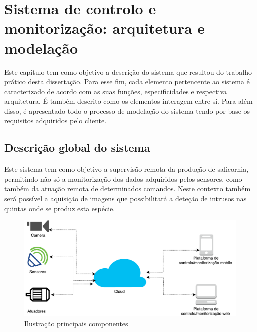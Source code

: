 

\chapter{Sistema de controlo e monitorização: arquitetura e modelação}


Este capítulo tem como objetivo a descrição do sistema que resultou do trabalho prático
desta dissertação. Para esse fim, cada elemento pertencente ao sistema é caracterizado de
acordo com as suas funções, especificidades e respectiva arquitetura. É também descrito como os elementos interagem entre si. Para além disso, é apresentado todo o processo de modelação do sistema tendo por base os requisitos adquiridos pelo cliente. 








\section{Descrição global do sistema}

Este sistema tem como objetivo a supervisão remota da produção de salicornia,  permitindo não só a monitorização dos dados adquiridos pelos sensores, como também da atuação remota de determinados comandos. Neste contexto também será possível a aquisição de imagens que possibilitará a deteção de intrusos nas quintas onde se produz esta espécie.


\begin{figure}[!htb]
	\centering
	\includegraphics[scale=0.40]{esquemas/global_arquitetura.pdf}
	\caption{Ilustração principais componentes}
	\label{componentesall}
\end{figure}



